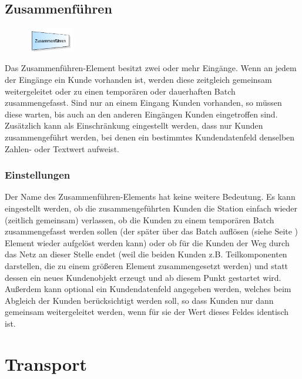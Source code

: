 \section{Zusammenführen}
\label{ref:ModelElementMatch}

\begin{figure}
\vspace{-22pt}
\includegraphics[width=2cm]{imageModelElementMatch.png}
\vspace{-22pt}
\end{figure}

Das Zusammenführen-Element besitzt zwei oder mehr Eingänge. Wenn an jedem der Eingänge ein Kunde vorhanden ist,
werden diese zeitgleich gemeinsam weitergeleitet oder zu einen temporären oder dauerhaften Batch zusammengefasst.
Sind nur an einem Eingang Kunden vorhanden, so müssen diese warten, bis auch an den anderen Eingängen Kunden eingetroffen sind.
Zusätzlich kann als Einschränkung eingestellt werden, dass nur Kunden zusammengeführt werden, bei denen ein bestimmtes
Kundendatenfeld denselben Zahlen- oder Textwert aufweist.

\subsection*{Einstellungen}

Der Name des Zusammenführen-Elements hat keine weitere Bedeutung. Es kann eingestellt werden, ob die zusammengeführten
Kunden die Station einfach wieder (zeitlich gemeinsam) verlassen, ob die Kunden zu einem temporären
Batch zusammengefasst werden sollen (der später über das Batch auflösen (siehe Seite \pageref{ref:ModelElementSeparate}) Element
wieder aufgelöst werden kann) oder ob für die Kunden der Weg durch das Netz an
dieser Stelle endet (weil die beiden Kunden z.B. Teilkomponenten darstellen, die zu einem größeren Element zusammengesetzt
werden) und statt dessen ein neues Kundenobjekt erzeugt und ab diesem Punkt gestartet wird.
Außerdem kann optional ein Kundendatenfeld angegeben werden, welches beim Abgleich der Kunden berücksichtigt werden soll,
so dass Kunden nur dann gemeinsam weitergeleitet werden, wenn für sie der Wert dieses Feldes identisch ist.





\chapter{Transport}

